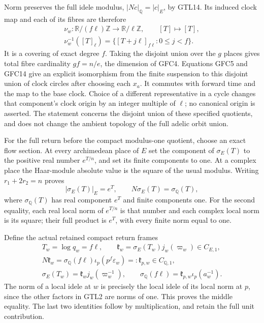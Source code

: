 Norm preserves the full idele modulus, $|Nc|_{\mathbb Q}=|c|_E$,
by GTL14. Its induced clock map and each of its fibres are therefore
\begin{equation}\tag{GFC17}
 \begin{gathered}
 \nu_w:\mathbb R/(f\ell)\mathbb Z\longrightarrow
                        \mathbb R/\ell\mathbb Z,
                  \qquad [T]\longmapsto[T],\\
 \nu_w^{-1}([T]_\ell)=
    \{[T+j\ell]_{f\ell}:0\le j<f\}.
 \end{gathered}
\end{equation}
It is a covering of exact degree $f$. Taking the disjoint union over
the $g$ places gives total fibre cardinality $gf=n/e$, the dimension
of GFC4. Equations GFC5 and GFC14 give an explicit isomorphism from
the finite suspension to this disjoint union of clock circles after
choosing each $x_a$. It commutes with forward time and the map to
the base clock. Choice of a different representative in a cycle
changes that component's clock origin by an integer multiple of
$\ell$; no canonical origin is asserted. The statement concerns
the disjoint union of these specified quotients, and does not
change the ambient topology of the full adelic orbit union.

For the full return before the compact modulus-one quotient, choose
an exact flow section. At every archimedean place of $E$ set the
component of $\sigma_E(T)$ to the positive real number $e^{T/n}$,
and set its finite components to one. At a complex place the
Haar-module absolute value is the square of the usual modulus.
Writing $r_1+2r_2=n$ proves
\begin{equation}\tag{GFC18}
 |\sigma_E(T)|_E=e^T,\qquad
 N\sigma_E(T)=\sigma_{\mathbb Q}(T),
\end{equation}
where $\sigma_{\mathbb Q}(T)$ has real component $e^T$ and finite
components one. For the second equality, each real local norm of
$e^{T/n}$ is that number and each complex local norm is its square;
their full product is $e^T$, with every finite norm equal to one.

Define the actual retained compact return frames
\begin{equation}\tag{GFC19}
 \begin{gathered}
 T_w=\log q_w=f\ell,\qquad
 \mathfrak{k}_w=\sigma_E(T_w)j_w(\varpi_w)\in C_{E,1},\\
 N\mathfrak{k}_w=\sigma_{\mathbb Q}(f\ell)\iota_p(p^f\varepsilon_w)
                  =:\mathfrak{k}_{p,w}\in C_{\mathbb Q,1},\\
 \sigma_E(T_w)=\mathfrak{k}_wj_w(\varpi_w^{-1}),\qquad
 \sigma_{\mathbb Q}(f\ell)=\mathfrak{k}_{p,w}\iota_p(a_w^{-1}).
 \end{gathered}
\end{equation}
The norm of a local idele at $w$ is precisely the local idele of
its local norm at $p$, since the other factors in GTL2 are norms
of one. This proves the middle equality. The last two identities
follow by multiplication, and retain the full unit contribution.

